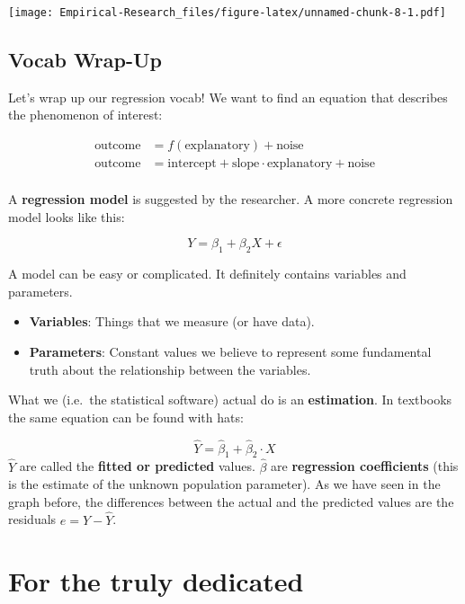 \documentclass[
]{book}
\providecommand{\tightlist}{%
  \setlength{\itemsep}{0pt}\setlength{\parskip}{0pt}}
\begin{document}
\texttt{[image: Empirical-Research\_files/figure-latex/unnamed-chunk-8-1.pdf]}

\hypertarget{vocab-wrap-up}{%
\subsection{Vocab Wrap-Up}\label{vocab-wrap-up}}

Let's wrap up our regression vocab! We want to find an equation that describes the phenomenon of interest:

\[ \begin{align}
\text{outcome} &= f(\text{explanatory}) + \text{noise} \tag{Generic statistical model} \\
\text{outcome} &= \text{intercept} + \text{slope} \cdot \text{explanatory} + \text{noise} \tag{Generic linear model} \\
\end{align}\]

A \textbf{regression model} is suggested by the researcher. A more concrete regression model looks like this:

\[Y = \beta_1 + \beta_2 X + \epsilon\]

A model can be easy or complicated. It definitely contains variables and parameters.

\begin{itemize}
\tightlist
\item
  \textbf{Variables}: Things that we measure (or have data).
\item
  \textbf{Parameters}: Constant values we believe to represent some fundamental truth about the relationship between the variables.
\end{itemize}

What we (i.e.~the statistical software) actual do is an \textbf{estimation}. In textbooks the same equation can be found with hats:

\[   \widehat{Y}  = \widehat{\beta}_1 + \widehat{\beta}_2 \cdot X \]
\(\widehat{Y}\) are called the \textbf{fitted or predicted} values. \(\widehat{\beta}\) are \textbf{regression coefficients} (this is the estimate of the unknown population parameter). As we have seen in the graph before, the differences between the actual and the predicted values are the residuals \(e = Y - \widehat{Y}\).

\hypertarget{for-the-truly-dedicated}{%
\section{For the truly dedicated}\label{for-the-truly-dedicated}}
\end{document}
